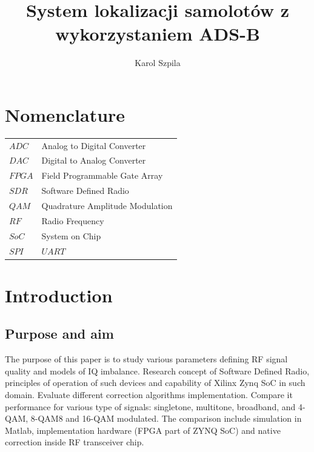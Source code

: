\documentclass[en,printmode]{mgr}
\title{System lokalizacji samolotów z wykorzystaniem ADS-B}
\author{Karol Szpila}
\begin{document}

\maketitle %

\chapter*{Nomenclature}
\begin{table}[!htb]
\begin{tabular}{ll}
$ADC$  & Analog to Digital Converter   \\
$DAC$  & Digital to Analog Converter   \\
$FPGA$ & Field Programmable Gate Array \\
$SDR$  & Software Defined Radio \\
$QAM$  & Quadrature Amplitude Modulation \\
$RF$   & Radio Frequency \\
$SoC$  & System on Chip   \\
$SPI$  &

$UART$                        
\end{tabular}
\end{table}

\tableofcontents %

\let\cleardoublepage\clearpage %

\chapter{Introduction}
	\section{Purpose and aim}
			The purpose of this paper is to study various parameters defining RF signal quality and models of IQ
		imbalance. Research concept of Software Defined Radio, principles of operation of such devices and capability
		of Xilinx Zynq SoC in such domain. Evaluate different correction algorithms implementation. Compare it
		performance for various type of signals: singletone, multitone, broadband, and 4-QAM, 8-QAM8 and 16-QAM
		modulated. The comparison include simulation in Matlab, implementation hardware (FPGA part of ZYNQ SoC) and 			native correction inside RF transceiver chip.
		
\end{document}
